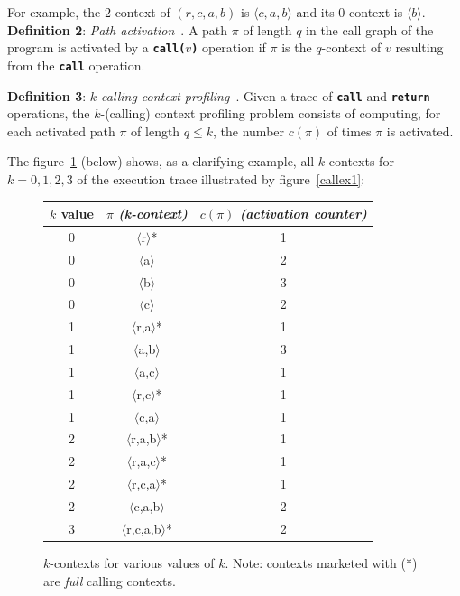 \documentclass[a4paper,11pt]{report}
\begin{document}
For example, the $2$-context of $(r,c,a,b)$ is $\langle c,a,b\rangle$ and its $0$-context is $\langle b\rangle$.\\

\textbf{Definition 2}: \emph{Path activation}~\cite{kccf}. 
A path $\pi$ of length $q$ in the call graph of the program is activated by 
a \texttt{\textbf{call(}}$v$\texttt{\textbf{)}}
operation if $\pi$ is the $q$-context of $v$ resulting from the \texttt{\textbf{call}} operation.

\textbf{Definition 3}: \emph{$k$-calling context profiling}~\cite{kccf}. Given a trace
of \texttt{\textbf{call}} and \texttt{\textbf{return}} operations, the $k$-(calling) context
profiling problem consists of computing, for each activated path $\pi$ of length $q\le k$, the number $c(\pi)$ of times $\pi$ is activated.

The figure~\ref{kctx1} (below) shows, as a clarifying example, all $k$-contexts for $k=0,1,2,3$ of the execution trace illustrated by figure~\ref{callex1}:

\begin{figure}[h]
\begin{center}
\begin{tabular}{c|c|c}
$k$ value & \textbf{$\pi$} \emph{(k-context)} & $c(\pi)$ \emph{(activation counter)}\\
\hline
0 & $\langle$r$\rangle$* & 1\\
0 & $\langle$a$\rangle$ & 2\\
0 & $\langle$b$\rangle$ & 3\\
0 & $\langle$c$\rangle$ & 2\\
\hline
1 & $\langle$r,a$\rangle$* & 1\\
1 & $\langle$a,b$\rangle$ & 3\\
1 & $\langle$a,c$\rangle$ & 1\\
1 & $\langle$r,c$\rangle$* & 1\\
1 & $\langle$c,a$\rangle$ & 1\\
\hline
2 & $\langle$r,a,b$\rangle$* & 1\\
2 & $\langle$r,a,c$\rangle$* & 1\\
2 & $\langle$r,c,a$\rangle$* & 1\\
2 & $\langle$c,a,b$\rangle$ & 2\\
\hline
3 & $\langle$r,c,a,b$\rangle$* & 2\\

\end{tabular}
\end{center}
\caption{$k$-contexts for various values of $k$.
Note: contexts marketed with (*) are \emph{full} calling contexts.}
\label{kctx1}
\end{figure}
\end{document}
